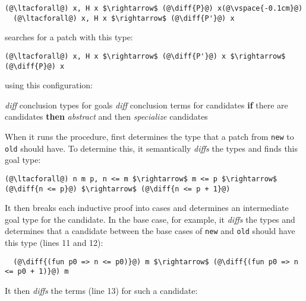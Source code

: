 \begin{lstlisting}[language=coq]
  (@\ltacforall@) x, H x $\rightarrow$ (@\diff{P}@) x(@\vspace{-0.1cm}@)
  (@\ltacforall@) x, H x $\rightarrow$ (@\diff{P'}@) x
\end{lstlisting}
\sysname searches for a patch with this type:

\begin{lstlisting}[language=coq]
  (@\ltacforall@) x, H x $\rightarrow$ (@\diff{P'}@) x $\rightarrow$ (@\diff{P}@) x
\end{lstlisting}
using this configuration:

\begin{algorithm}
\footnotesize
\begin{algorithmic}[1]
    \STATE \textit{diff} conclusion types for goals
    \STATE \textit{diff} conclusion terms for candidates
    \STATE \textbf{if} there are candidates \textbf{then}
    \STATE \hspace*{1em} \textit{abstract} and then \textit{specialize} candidates
\end{algorithmic}
\end{algorithm}

When it runs the procedure,
\sysname first determines the type that a patch from \lstinline{new} to \lstinline{old} should have.
To determine this, it semantically \textit{diffs} the types and finds this goal type:

\begin{lstlisting}[language=coq]
  (@\ltacforall@) n m p, n <= m $\rightarrow$ m <= p $\rightarrow$ (@\diff{n <= p}@) $\rightarrow$ (@\diff{n <= p + 1}@)
\end{lstlisting}
It then breaks each inductive proof into cases and determines an intermediate goal type for the candidate.
In the base case, for example, it \textit{diffs} the types and determines that a candidate
between the base cases of \lstinline{new} and \lstinline{old} should have this type (lines 11 and 12):

\begin{lstlisting}
  (@\diff{(fun p0 => n <= p0)}@) m $\rightarrow$ (@\diff{(fun p0 => n <= p0 + 1)}@) m
\end{lstlisting}
It then \textit{diffs} the terms (line 13) for such a candidate:


